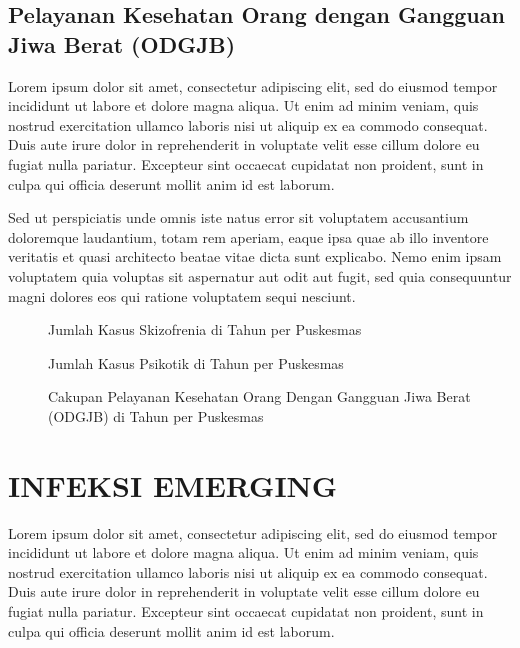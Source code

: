 \subsection{Pelayanan Kesehatan Orang dengan Gangguan Jiwa Berat (ODGJB)}
Lorem ipsum dolor sit amet, consectetur adipiscing elit, sed do eiusmod tempor incididunt ut labore et dolore magna aliqua. Ut enim ad minim veniam, quis nostrud exercitation ullamco laboris nisi ut aliquip ex ea commodo consequat. Duis aute irure dolor in reprehenderit in voluptate velit esse cillum dolore eu fugiat nulla pariatur. Excepteur sint occaecat cupidatat non proident, sunt in culpa qui officia deserunt mollit anim id est laborum.

Sed ut perspiciatis unde omnis iste natus error sit voluptatem accusantium doloremque laudantium, totam rem aperiam, eaque ipsa quae ab illo inventore veritatis et quasi architecto beatae vitae dicta sunt explicabo. Nemo enim ipsam voluptatem quia voluptas sit aspernatur aut odit aut fugit, sed quia consequuntur magni dolores eos qui ratione voluptatem sequi nesciunt.

\begin{figure}[H]
	\centering
	\caption{Jumlah Kasus Skizofrenia di \namaKabupaten Tahun \tP per Puskesmas}
	\label{fig:Kasus-Skizofrenia}
\end{figure}

\begin{figure}[H]
	\centering
	\caption{Jumlah Kasus Psikotik di \namaKabupaten Tahun \tP per Puskesmas}
	\label{fig:Kasus-Psikotik}
\end{figure}

\begin{figure}[H]
	\centering
	\caption{Cakupan Pelayanan Kesehatan Orang Dengan Gangguan Jiwa Berat (ODGJB) di \namaKabupaten Tahun \tP per Puskesmas}
	\label{fig:Pelayanan-ODGJB}
\end{figure}


\section[INFEKSI EMERGING]{INFEKSI EMERGING}
Lorem ipsum dolor sit amet, consectetur adipiscing elit, sed do eiusmod tempor incididunt ut labore et dolore magna aliqua. Ut enim ad minim veniam, quis nostrud exercitation ullamco laboris nisi ut aliquip ex ea commodo consequat. Duis aute irure dolor in reprehenderit in voluptate velit esse cillum dolore eu fugiat nulla pariatur. Excepteur sint occaecat cupidatat non proident, sunt in culpa qui officia deserunt mollit anim id est laborum.

